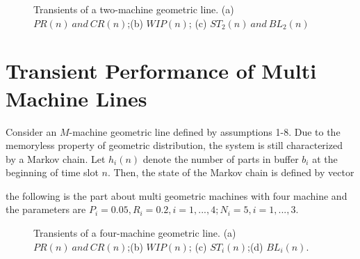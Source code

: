 \begin{figure*}[!h]
	\centering
	\caption{Transients of a two-machine geometric line. (a) $PR(n)\ and\ CR(n)$;(b) $WIP(n)$; (c) $ST_2(n)\ and\ BL_2(n)$}
	\label{Transients of a two-machine geometric line}
\end{figure*}



\section{Transient Performance of Multi Machine Lines}
\noindent Consider an $M$-machine geometric line defined by assumptions 1-8. Due to the memoryless property of geometric distribution, the system is still characterized by a Markov chain. Let $h_i(n)$ denote the number of parts in buffer $b_i$ at the beginning of time slot $n$. Then, the state of the Markov chain is defined by vector

the following is the part about multi geometric machines with four machine and the parameters are 
$P_i = 0.05, R_i = 0.2, i = 1,...,4; N_i = 5, i = 1,...,3.$

\begin{figure*}[!h]
	\centering
	\caption{Transients of a four-machine geometric line. (a) $PR(n) \ and\ CR(n)$;(b) $WIP(n)$; (c) $ST_i(n)$;(d) $BL_i(n)$.}
	\label{Transients of a four-machine geometric line}
\end{figure*}


